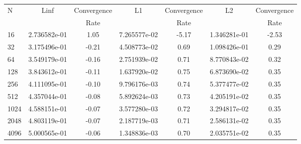 \documentclass[12pt]{article}
\begin{document}
	\begin{tabular}{l|c|c|c|c|c|c}
		N&Linf&Convergence&L1&Convergence&L2&Convergence\\
		&&Rate&&Rate&&Rate\\
		\hline
		16&2.736582e-01&1.05&7.265577e-02&-5.17&1.346281e-01&-2.53\\
		\hline
		32&3.175496e-01&-0.21&4.508773e-02&0.69&1.098426e-01&0.29\\
		\hline
		64&3.549179e-01&-0.16&2.751939e-02&0.71&8.770843e-02&0.32\\
		\hline
		128&3.843612e-01&-0.11&1.637920e-02&0.75&6.873690e-02&0.35\\
		\hline
		256&4.111095e-01&-0.10&9.796176e-03&0.74&5.377477e-02&0.35\\
		\hline
		512&4.357044e-01&-0.08&5.892624e-03&0.73&4.205191e-02&0.35\\
		\hline
		1024&4.588151e-01&-0.07&3.577280e-03&0.72&3.294817e-02&0.35\\
		\hline
		2048&4.803119e-01&-0.07&2.187719e-03&0.71&2.586131e-02&0.35\\
		\hline
		4096&5.000565e-01&-0.06&1.348836e-03&0.70&2.035751e-02&0.35\\
	\end{tabular}
\end{document}
